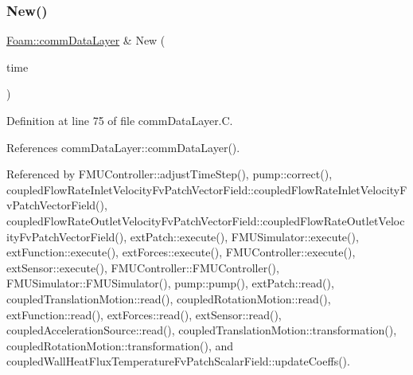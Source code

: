 \mbox{\label{classFoam_1_1commDataLayer_afba2bff8d4fa91c093e6f93ee18272dd}} 
\subsubsection{\texorpdfstring{New()}{New()}}
{\footnotesize\ttfamily \hyperlink{classFoam_1_1commDataLayer}{Foam\+::comm\+Data\+Layer} \& New (\begin{DoxyParamCaption}\item[{const Time \&}]{time }\end{DoxyParamCaption})\hspace{0.3cm}{\ttfamily [static]}}



Definition at line 75 of file comm\+Data\+Layer.\+C.



References comm\+Data\+Layer\+::comm\+Data\+Layer().



Referenced by F\+M\+U\+Controller\+::adjust\+Time\+Step(), pump\+::correct(), coupled\+Flow\+Rate\+Inlet\+Velocity\+Fv\+Patch\+Vector\+Field\+::coupled\+Flow\+Rate\+Inlet\+Velocity\+Fv\+Patch\+Vector\+Field(), coupled\+Flow\+Rate\+Outlet\+Velocity\+Fv\+Patch\+Vector\+Field\+::coupled\+Flow\+Rate\+Outlet\+Velocity\+Fv\+Patch\+Vector\+Field(), ext\+Patch\+::execute(), F\+M\+U\+Simulator\+::execute(), ext\+Function\+::execute(), ext\+Forces\+::execute(), F\+M\+U\+Controller\+::execute(), ext\+Sensor\+::execute(), F\+M\+U\+Controller\+::\+F\+M\+U\+Controller(), F\+M\+U\+Simulator\+::\+F\+M\+U\+Simulator(), pump\+::pump(), ext\+Patch\+::read(), coupled\+Translation\+Motion\+::read(), coupled\+Rotation\+Motion\+::read(), ext\+Function\+::read(), ext\+Forces\+::read(), ext\+Sensor\+::read(), coupled\+Acceleration\+Source\+::read(), coupled\+Translation\+Motion\+::transformation(), coupled\+Rotation\+Motion\+::transformation(), and coupled\+Wall\+Heat\+Flux\+Temperature\+Fv\+Patch\+Scalar\+Field\+::update\+Coeffs().

